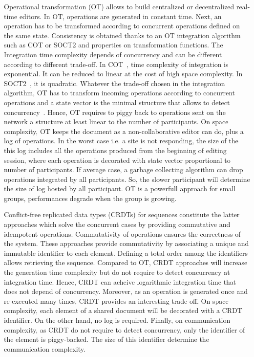 \begin{asparadesc}

\item [Operational transformation (OT)] allows to build centralized or
  decentralized real-time editors. In OT, operations are generated in
  constant time. Next, an operation has to be transformed according to
  concurrent operations defined on the same state. Consistency is
  obtained thanks to an OT integration algorithm such as COT or SOCT2
  and properties on transformation functions. The Integration time
  complexity depends of concurrency and can be different according to
  different trade-off. In COT~\cite{sun2009contextbased}, time
  complexity of integration is exponential. It can be reduced to
  linear at the cost of high space complexity. In
  SOCT2~\cite{Vidot00}, it is quadratic. Whatever the trade-off chosen
  in the integration algorithm, OT has to transform incoming
  operations according to concurrent operations and a state vector is
  the minimal structure that allows to detect
  concurrency~\cite{charronbost1991concerning}. Hence, OT requires to
  piggy back to operations sent on the network a structure at least
  linear to the number of participants. On space complexity, OT keeps
  the document as a non-collaborative editor can do, plus a log of
  operations. In the worst case i.e. a site is not responding, the
  size of the this log includes all the operations produced from the
  beginning of editing session, where each operation is decorated with
  state vector proportional to number of participants. If average
  case, a garbage collecting algorithm can drop operations integrated
  by all participants. So, the slower participant will determine the
  size of log hosted by all participant. OT is a powerfull approach
  for small groups, performances degrade when the group is growing.

\item [Conflict-free replicated data types] (CRDTs) for sequences
  constitute the latter approaches which solve the concurrent cases by
  providing commutative and idempotent operations. Commutativity of
  operations ensures the correctness of the system. These approaches
  provide commutativity by associating a unique and immutable
  identifier to each element. Defining a total order among the
  identifiers allows retrieving the sequence. Compared to OT, CRDT
  approaches will increase the generation time complexity but do not
  require to detect concurrency at integration time. Hence, CRDT can
  acheive logarithmic integration time that does not depend of
  concurrency. Moreover, as an operation is generated once and
  re-executed many times, CRDT provides an interesting trade-off. On
  space complexity, each element of a shared document will be
  decorated with a CRDT identifier. On the other hand, no log is
  required. Finally, on communication complexity, as CRDT do not require to
  detect concurrency, only the identifier of the element is
  piggy-backed. The size of this identifier determine the
  communication complexity.


\end{asparadesc}
